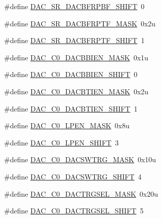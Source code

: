 \begin{DoxyCompactItemize}
\item 
\#define \hyperlink{group___d_a_c___register___masks_ga5581f254327f3d4e57b161b5c771fb1c}{D\+A\+C\+\_\+\+S\+R\+\_\+\+D\+A\+C\+B\+F\+R\+P\+B\+F\+\_\+\+S\+H\+I\+FT}~0
\item 
\#define \hyperlink{group___d_a_c___register___masks_ga662e824677c1a7a94ddd36e90f3d37d5}{D\+A\+C\+\_\+\+S\+R\+\_\+\+D\+A\+C\+B\+F\+R\+P\+T\+F\+\_\+\+M\+A\+SK}~0x2u
\item 
\#define \hyperlink{group___d_a_c___register___masks_gad1df4286616f5369388e865f5f821ae9}{D\+A\+C\+\_\+\+S\+R\+\_\+\+D\+A\+C\+B\+F\+R\+P\+T\+F\+\_\+\+S\+H\+I\+FT}~1
\item 
\#define \hyperlink{group___d_a_c___register___masks_gadc37ad99d42f4b9d0e26ce03f2ac79ad}{D\+A\+C\+\_\+\+C0\+\_\+\+D\+A\+C\+B\+B\+I\+E\+N\+\_\+\+M\+A\+SK}~0x1u
\item 
\#define \hyperlink{group___d_a_c___register___masks_ga956aa991114a1bb71a891e66d7092d1e}{D\+A\+C\+\_\+\+C0\+\_\+\+D\+A\+C\+B\+B\+I\+E\+N\+\_\+\+S\+H\+I\+FT}~0
\item 
\#define \hyperlink{group___d_a_c___register___masks_gad8a60a2fa6211ff08bba4b9648fb8daa}{D\+A\+C\+\_\+\+C0\+\_\+\+D\+A\+C\+B\+T\+I\+E\+N\+\_\+\+M\+A\+SK}~0x2u
\item 
\#define \hyperlink{group___d_a_c___register___masks_ga1f8eb9a96341365badba1280bed49e05}{D\+A\+C\+\_\+\+C0\+\_\+\+D\+A\+C\+B\+T\+I\+E\+N\+\_\+\+S\+H\+I\+FT}~1
\item 
\#define \hyperlink{group___d_a_c___register___masks_ga54a04b9ae84c5a4f8977ae2e1a889717}{D\+A\+C\+\_\+\+C0\+\_\+\+L\+P\+E\+N\+\_\+\+M\+A\+SK}~0x8u
\item 
\#define \hyperlink{group___d_a_c___register___masks_ga97aaa812a3938df3559cb40b893db431}{D\+A\+C\+\_\+\+C0\+\_\+\+L\+P\+E\+N\+\_\+\+S\+H\+I\+FT}~3
\item 
\#define \hyperlink{group___d_a_c___register___masks_ga7e785d90fec3c1817fc53fea41f41644}{D\+A\+C\+\_\+\+C0\+\_\+\+D\+A\+C\+S\+W\+T\+R\+G\+\_\+\+M\+A\+SK}~0x10u
\item 
\#define \hyperlink{group___d_a_c___register___masks_ga25e2afd71ee5cc41adde6f072c9d2604}{D\+A\+C\+\_\+\+C0\+\_\+\+D\+A\+C\+S\+W\+T\+R\+G\+\_\+\+S\+H\+I\+FT}~4
\item 
\#define \hyperlink{group___d_a_c___register___masks_gac6dd81bc6500fc4b972c62bde339f31d}{D\+A\+C\+\_\+\+C0\+\_\+\+D\+A\+C\+T\+R\+G\+S\+E\+L\+\_\+\+M\+A\+SK}~0x20u
\item 
\#define \hyperlink{group___d_a_c___register___masks_ga32f43711fa193364231213bd67c989f4}{D\+A\+C\+\_\+\+C0\+\_\+\+D\+A\+C\+T\+R\+G\+S\+E\+L\+\_\+\+S\+H\+I\+FT}~5

\end{DoxyCompactItemize}
